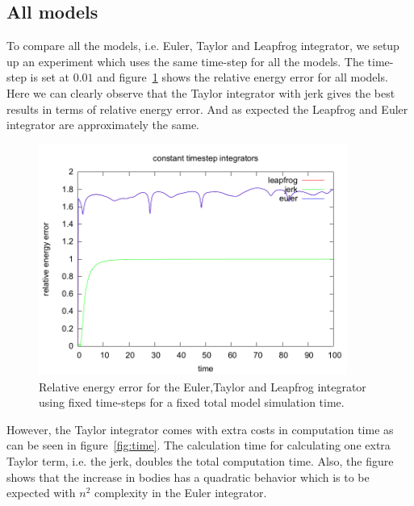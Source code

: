 \documentclass[11pt]{article} %
\begin{document}
\subsection{All models}
\label{sec:res:all}
To compare all the models, i.e. Euler, Taylor and Leapfrog integrator, we setup up an experiment which uses the same time-step for all the models. The time-step is set at $0.01$ and figure~\ref{fig:energy_comparison} shows the relative energy error for all models. Here we can clearly observe that the Taylor integrator with jerk gives the best results in terms of relative energy error. And as expected the Leapfrog and Euler integrator are approximately the same. 
\begin{figure}
    \includegraphics[width=0.9\textwidth]{constant_time.png}
    \caption{Relative energy error for the Euler,Taylor and Leapfrog integrator using fixed time-steps for a fixed total model simulation time.}
    \label{fig:energy_comparison}
\end{figure}
However, the Taylor integrator comes with extra costs in computation time as can be seen in figure~\ref{fig:time}. The calculation time for calculating one extra Taylor term, i.e. the jerk, doubles the total computation time. Also, the figure shows that the increase in bodies has a quadratic behavior which is to be expected with $n^2$ complexity in the Euler integrator. 
\end{document}

